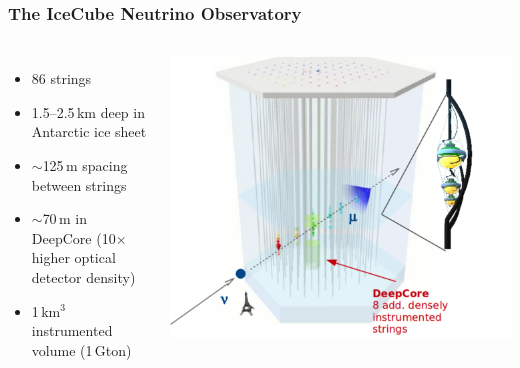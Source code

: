 \documentclass[xcolor=dvipsnames]{beamer}
\begin{document}
\begin{frame}
\begin{columns}[c]
\end{columns}

\end{frame}

\begin{frame}
\frametitle{The IceCube Neutrino Observatory}

\begin{columns}[c]
\begin{itemize}
\item 86 strings
\item 1.5--2.5\,km deep in Antarctic ice sheet
\item $\sim$125\,m spacing between strings
\item $\sim$70\,m in DeepCore (10$\times$ higher optical detector density)
\item 1\,km$^3$ instrumented volume (1\,Gton)
\end{itemize}
\includegraphics[width=\columnwidth]{icecube}
\end{columns}
\end{frame}
\end{document}
